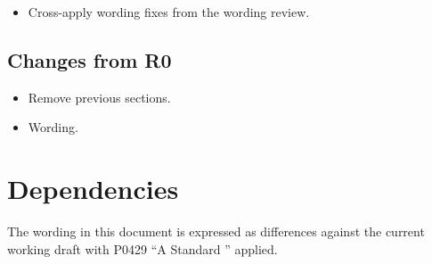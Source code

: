 \begin{itemize}
  \item Cross-apply wording fixes from the  wording review.
\end{itemize}

\subsection{Changes from R0}

\begin{itemize}
  \item Remove previous sections.
  \item Wording.
\end{itemize}

\section{Dependencies}

The wording in this document is expressed as differences against the current
working draft with P0429 ``A Standard '' applied.
